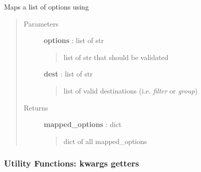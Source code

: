 \documentclass[letterpaper,10pt,english]{sphinxmanual}
\begin{document}

\begin{fulllineitems}
\label{pytan.utils:pytan.utils.map_options}
Maps a list of options using {\hyperref[pytan.utils:pytan.utils.map_option]{}}
\begin{quote}\begin{description}
\item[{Parameters}] \leavevmode
\textbf{options} : list of str
\begin{quote}

list of str that should be validated
\end{quote}

\textbf{dest} : list of str
\begin{quote}

list of valid destinations (i.e. \emph{filter} or \emph{group})
\end{quote}

\item[{Returns}] \leavevmode
\textbf{mapped\_options} : dict
\begin{quote}

dict of all mapped\_options
\end{quote}

\end{description}\end{quote}

\end{fulllineitems}



\subsubsection{Utility Functions: kwargs getters}
\label{pytan.utils:utility-functions-kwargs-getters}
\end{document}
